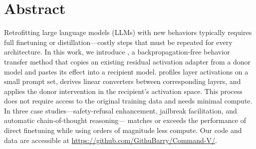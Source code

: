 
\section{Abstract}
\label{sec-abstract}
Retrofitting large language models (LLMs) with new behaviors typically requires full finetuning or distillation---costly steps that must be repeated for every architecture.
In this work, we introduce \cmdv{}, a backpropagation-free behavior transfer method that copies an existing residual activation adapter from a donor model and pastes its effect into a recipient model.
\cmdv{} profiles layer activations on a small prompt set, derives linear converters between corresponding layers, and applies the donor intervention in the recipient's activation space.
This process does not require access to the original training data and needs minimal compute.
In three case studies---safety-refusal enhancement, jailbreak facilitation, and automatic chain-of-thought reasoning---\cmdv{} matches or exceeds the performance of direct finetuning while using orders of magnitude less compute.
Our code and data are accessible at \url{https://github.com/GithuBarry/Command-V/}.
